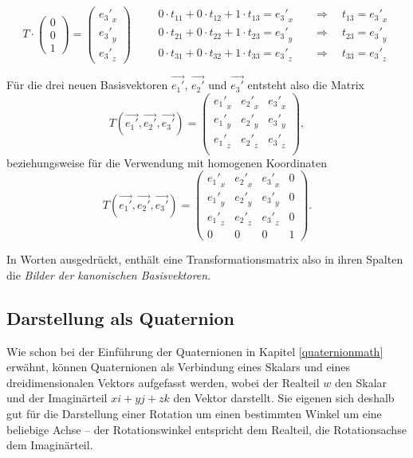 \begin{equation}
 T \cdot \begin{pmatrix} 0 \\ 0 \\ 1 \end{pmatrix} = \begin{pmatrix} {e_3'}_x \\ {e_3'}_y \\ {e_3'}_z \end{pmatrix} \qquad
\begin{aligned}
 0 \cdot t_{11} + 0 \cdot t_{12} + 1 \cdot t_{13} = {e_3'}_x \quad &\Rightarrow \quad t_{13} = {e_3'}_x \\
 0 \cdot t_{21} + 0 \cdot t_{22} + 1 \cdot t_{23} = {e_3'}_y \quad &\Rightarrow \quad t_{23} = {e_3'}_y \\
 0 \cdot t_{31} + 0 \cdot t_{32} + 1 \cdot t_{33} = {e_3'}_z \quad &\Rightarrow \quad t_{33} = {e_3'}_z
\end{aligned}
\end{equation}

Für die drei neuen Basisvektoren $\vec{e_1'}$, $\vec{e_2'}$ und $\vec{e_3'}$ entsteht also die Matrix
\begin{equation}
 T\left(\vec{e_1'}, \vec{e_2'}, \vec{e_3'}\right) =
 \begin{pmatrix}
  {e_1'}_x & {e_2'}_x & {e_3'}_x \\
  {e_1'}_y & {e_2'}_y & {e_3'}_y \\
  {e_1'}_z & {e_2'}_z & {e_3'}_z \\
 \end{pmatrix},
\end{equation}
beziehungsweise für die Verwendung mit homogenen Koordinaten
\begin{equation}
 T\left(\vec{e_1'}, \vec{e_2'}, \vec{e_3'}\right) =
 \begin{pmatrix}
  {e_1'}_x & {e_2'}_x & {e_3'}_x & 0 \\
  {e_1'}_y & {e_2'}_y & {e_3'}_y & 0 \\
  {e_1'}_z & {e_2'}_z & {e_3'}_z & 0 \\
  0 & 0 & 0 & 1
 \end{pmatrix}.
\end{equation}

In Worten ausgedrückt, enthält eine Transformationsmatrix also in ihren Spalten die \emph{Bilder der kanonischen Basisvektoren}.

\subsection{Darstellung als Quaternion}
Wie schon bei der Einführung der Quaternionen in Kapitel \ref{quaternionmath} erwähnt, können Quaternionen als Verbindung eines Skalars und eines dreidimensionalen Vektors aufgefasst werden, wobei der Realteil $w$ den Skalar und der Imaginärteil $xi + yj + zk$ den Vektor  darstellt. Sie eigenen sich deshalb gut für die Darstellung einer Rotation um einen bestimmten Winkel um eine beliebige Achse -- der Rotationswinkel entspricht dem Realteil, die Rotationsachse dem Imaginärteil.

